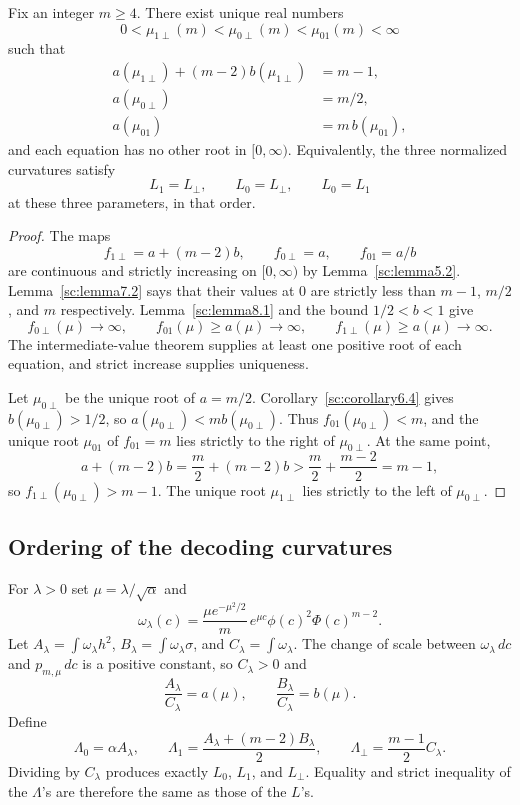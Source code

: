 \begin{theorem}\label{sc:theorem8.3}
Fix an integer \(m\ge 4\). There exist unique real numbers
\[
0<\mu_{1\perp}(m)<\mu_{0\perp}(m)<\mu_{01}(m)<\infty
\]
such that
\begin{align*}
a(\mu_{1\perp})+(m-2)b(\mu_{1\perp})&=m-1,\\
a(\mu_{0\perp})&=m/2,\\
a(\mu_{01})&=m\,b(\mu_{01}),
\end{align*}
and each equation has no other root in \([0,\infty)\). Equivalently, the three normalized curvatures satisfy
\[
L_1=L_\perp,\qquad L_0=L_\perp,\qquad L_0=L_1
\]
at these three parameters, in that order.

\end{theorem}
\begin{proof}
The maps
\[
f_{1\perp}=a+(m-2)b,\qquad f_{0\perp}=a,\qquad f_{01}=a/b
\]
are continuous and strictly increasing on \([0,\infty)\) by Lemma~\ref{sc:lemma5.2}. Lemma~\ref{sc:lemma7.2} says that their values at \(0\) are strictly less than \(m-1\), \(m/2\), and \(m\) respectively. Lemma~\ref{sc:lemma8.1} and the bound \(1/2<b<1\) give
\[
f_{0\perp}(\mu)\to\infty,\qquad f_{01}(\mu)\ge a(\mu)\to\infty,\qquad f_{1\perp}(\mu)\ge a(\mu)\to\infty.
\]
The intermediate-value theorem supplies at least one positive root of each equation, and strict increase supplies uniqueness.

Let \(\mu_{0\perp}\) be the unique root of \(a=m/2\). Corollary~\ref{sc:corollary6.4} gives \(b(\mu_{0\perp})>1/2\), so \(a(\mu_{0\perp})<m b(\mu_{0\perp})\). Thus \(f_{01}(\mu_{0\perp})<m\), and the unique root \(\mu_{01}\) of \(f_{01}=m\) lies strictly to the right of \(\mu_{0\perp}\). At the same point,
\[
a+(m-2)b=\frac m2+(m-2)b>\frac m2+\frac{m-2}{2}=m-1,
\]
so \(f_{1\perp}(\mu_{0\perp})>m-1\). The unique root \(\mu_{1\perp}\) lies strictly to the left of \(\mu_{0\perp}\).

\end{proof}

\subsection{Ordering of the decoding curvatures}\label{sc:sub9}

For \(\lambda>0\) set \(\mu=\lambda/\sqrt\alpha\) and
\[
\omega_\lambda(c)=\frac{\mu e^{-\mu^2/2}}{m}\,e^{\mu c}\phi(c)^2\Phi(c)^{m-2}.
\]
Let \(A_\lambda=\int\omega_\lambda h^2\), \(B_\lambda=\int\omega_\lambda\sigma\), and \(C_\lambda=\int\omega_\lambda\). The change of scale between \(\omega_\lambda\,dc\) and \(p_{m,\mu}\,dc\) is a positive constant, so \(C_\lambda>0\) and
\[
\frac{A_\lambda}{C_\lambda}=a(\mu),\qquad \frac{B_\lambda}{C_\lambda}=b(\mu).
\]
Define
\[
\Lambda_0=\alpha A_\lambda,\qquad
\Lambda_1=\frac{A_\lambda+(m-2)B_\lambda}{2},\qquad
\Lambda_\perp=\frac{m-1}{2}C_\lambda.
\]
Dividing by \(C_\lambda\) produces exactly \(L_0\), \(L_1\), and \(L_\perp\). Equality and strict inequality of the \(\Lambda\)'s are therefore the same as those of the \(L\)'s.

